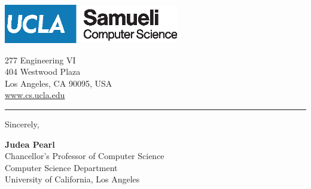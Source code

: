 \documentclass[11pt, a4paper, hidelinks]{letter} %
\begin{document}
\begin{minipage}{0.6\textwidth}
\vspace{-17mm}
\includegraphics[width=3in]{../asset/UCLA_CS.eps}\\
\end{minipage}
\hfill
\begin{minipage}{0.3\textwidth}\raggedright
\vspace{-20mm}
\footnotesize{
277 Engineering VI\\
404 Westwood Plaza\\
Los Angeles, CA 90095, USA \\
\url{www.cs.ucla.edu}}
\end{minipage}
\hrule
\vspace{3mm}
\rightline{\today}





\vspace{+2mm}
Sincerely,
\vspace{10pt}
\vspace{10pt}


\textbf{Judea Pearl}\\
Chancellor's Professor of Computer Science\\
Computer Science Department \\
University of California, Los Angeles
\end{document}
